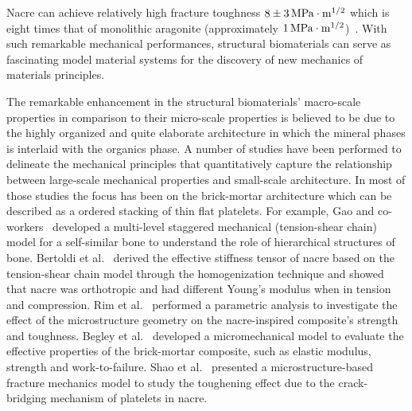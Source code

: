 \documentclass[preprint,12pt,times]{elsarticle}
\numberwithin{equation}{section}
\renewcommand{\>}{$\Rightarrow$}
\begin{document}


Nacre can achieve relatively high fracture toughness $8\pm3 \,\rm{MPa}\cdot m^{1/2}$ which is eight times that of monolithic aragonite (approximately $1\,\rm{MPa}\cdot m^{1/2}$)~\cite{lin2005growth}.
%
With such remarkable mechanical performances, structural biomaterials can serve as fascinating model material systems for the discovery of new mechanics of materials principles.
%


The remarkable enhancement in the structural biomaterials' macro-scale properties in comparison to their micro-scale properties is believed to be due to the highly organized and quite elaborate architecture in which the mineral phases is interlaid with the organics phase.
A number of studies have been performed to delineate the mechanical principles that quantitatively capture the relationship between large-scale mechanical properties and small-scale architecture.
%
In most of those studies the focus has been on the brick-mortar architecture which can be described as a ordered stacking of thin flat platelets.
%
For example, Gao and co-workers~\cite{gao2006application, ji2010mechanical} developed a multi-level staggered mechanical (tension-shear chain) model for a self-similar bone to understand the role of hierarchical structures of bone.
%
Bertoldi et al.~\cite{bertoldi2008nacre} derived the effective stiffness tensor of nacre based on the tension-shear chain model through the homogenization technique and showed that nacre was orthotropic and had different Young's modulus when in tension and compression.
%
Rim et al.~\cite{rim2011dimensional} performed a parametric analysis to investigate the effect of the microstructure geometry on the nacre-inspired composite's strength and toughness.
%
Begley et al.~\cite{begley2012micromechanical} developed a micromechanical model to evaluate the effective properties of the brick-mortar composite, such as elastic modulus, strength and work-to-failure.
%
Shao et al.~\cite{shao2012discontinuous} presented a microstructure-based fracture mechanics model to study the toughening effect due to the crack-bridging mechanism of platelets in nacre.
%
\end{document}
